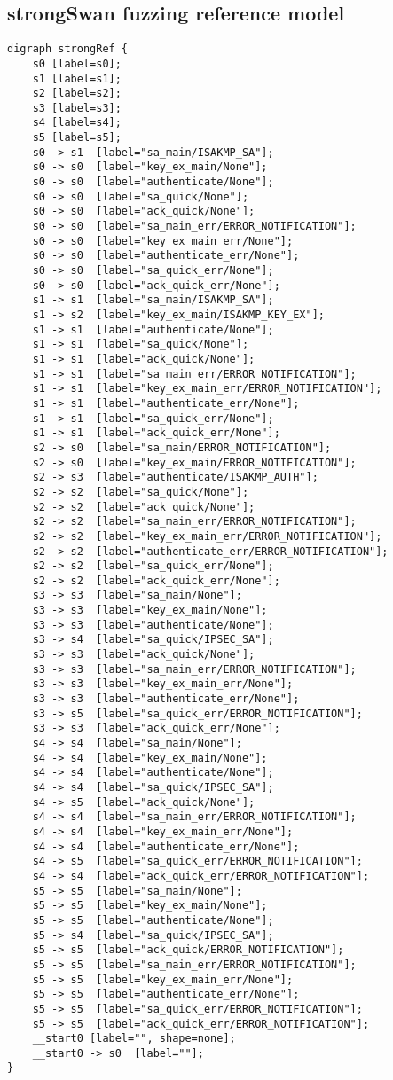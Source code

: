 \subsection*{strongSwan fuzzing reference model}
\begin{lstlisting}[numbers=none]
digraph strongRef {
	s0 [label=s0];
	s1 [label=s1];
	s2 [label=s2];
	s3 [label=s3];
	s4 [label=s4];
	s5 [label=s5];
	s0 -> s1  [label="sa_main/ISAKMP_SA"];
	s0 -> s0  [label="key_ex_main/None"];
	s0 -> s0  [label="authenticate/None"];
	s0 -> s0  [label="sa_quick/None"];
	s0 -> s0  [label="ack_quick/None"];
	s0 -> s0  [label="sa_main_err/ERROR_NOTIFICATION"];
	s0 -> s0  [label="key_ex_main_err/None"];
	s0 -> s0  [label="authenticate_err/None"];
	s0 -> s0  [label="sa_quick_err/None"];
	s0 -> s0  [label="ack_quick_err/None"];
	s1 -> s1  [label="sa_main/ISAKMP_SA"];
	s1 -> s2  [label="key_ex_main/ISAKMP_KEY_EX"];
	s1 -> s1  [label="authenticate/None"];
	s1 -> s1  [label="sa_quick/None"];
	s1 -> s1  [label="ack_quick/None"];
	s1 -> s1  [label="sa_main_err/ERROR_NOTIFICATION"];
	s1 -> s1  [label="key_ex_main_err/ERROR_NOTIFICATION"];
	s1 -> s1  [label="authenticate_err/None"];
	s1 -> s1  [label="sa_quick_err/None"];
	s1 -> s1  [label="ack_quick_err/None"];
	s2 -> s0  [label="sa_main/ERROR_NOTIFICATION"];
	s2 -> s0  [label="key_ex_main/ERROR_NOTIFICATION"];
	s2 -> s3  [label="authenticate/ISAKMP_AUTH"];
	s2 -> s2  [label="sa_quick/None"];
	s2 -> s2  [label="ack_quick/None"];
	s2 -> s2  [label="sa_main_err/ERROR_NOTIFICATION"];
	s2 -> s2  [label="key_ex_main_err/ERROR_NOTIFICATION"];
	s2 -> s2  [label="authenticate_err/ERROR_NOTIFICATION"];
	s2 -> s2  [label="sa_quick_err/None"];
	s2 -> s2  [label="ack_quick_err/None"];
	s3 -> s3  [label="sa_main/None"];
	s3 -> s3  [label="key_ex_main/None"];
	s3 -> s3  [label="authenticate/None"];
	s3 -> s4  [label="sa_quick/IPSEC_SA"];
	s3 -> s3  [label="ack_quick/None"];
	s3 -> s3  [label="sa_main_err/ERROR_NOTIFICATION"];
	s3 -> s3  [label="key_ex_main_err/None"];
	s3 -> s3  [label="authenticate_err/None"];
	s3 -> s5  [label="sa_quick_err/ERROR_NOTIFICATION"];
	s3 -> s3  [label="ack_quick_err/None"];
	s4 -> s4  [label="sa_main/None"];
	s4 -> s4  [label="key_ex_main/None"];
	s4 -> s4  [label="authenticate/None"];
	s4 -> s4  [label="sa_quick/IPSEC_SA"];
	s4 -> s5  [label="ack_quick/None"];
	s4 -> s4  [label="sa_main_err/ERROR_NOTIFICATION"];
	s4 -> s4  [label="key_ex_main_err/None"];
	s4 -> s4  [label="authenticate_err/None"];
	s4 -> s5  [label="sa_quick_err/ERROR_NOTIFICATION"];
	s4 -> s4  [label="ack_quick_err/ERROR_NOTIFICATION"];
	s5 -> s5  [label="sa_main/None"];
	s5 -> s5  [label="key_ex_main/None"];
	s5 -> s5  [label="authenticate/None"];
	s5 -> s4  [label="sa_quick/IPSEC_SA"];
	s5 -> s5  [label="ack_quick/ERROR_NOTIFICATION"];
	s5 -> s5  [label="sa_main_err/ERROR_NOTIFICATION"];
	s5 -> s5  [label="key_ex_main_err/None"];
	s5 -> s5  [label="authenticate_err/None"];
	s5 -> s5  [label="sa_quick_err/ERROR_NOTIFICATION"];
	s5 -> s5  [label="ack_quick_err/ERROR_NOTIFICATION"];
	__start0 [label="", shape=none];
	__start0 -> s0  [label=""];
}
\end{lstlisting}
\newpage


